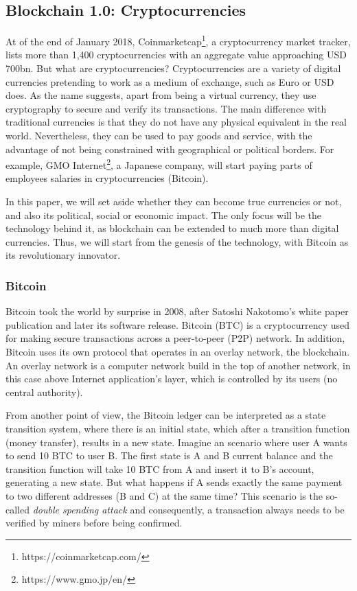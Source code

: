 \subsection{Blockchain 1.0: Cryptocurrencies}

At of the end of January 2018, Coinmarketcap\footnote{https://coinmarketcap.com/}, a cryptocurrency market tracker, lists more than 1,400 cryptocurrencies with an aggregate value approaching USD 700bn. But what are cryptocurrencies? Cryptocurrencies are a variety of digital currencies pretending to work as a medium of exchange, such as Euro or USD does. As the name suggests, apart from being a virtual currency, they use cryptography to secure and verify its transactions. The main difference with traditional currencies is that they do not have any physical equivalent in the real world. Nevertheless, they can be used to pay goods and service, with the advantage of not being constrained with geographical or political borders. For example, GMO Internet\footnote{https://www.gmo.jp/en/}, a Japanese company, will start paying parts of employees salaries in cryptocurrencies (Bitcoin).

In this paper, we will set aside whether they can become true currencies or not, and also its political, social or economic impact. The only focus will be the technology behind it, as blockchain can be extended to much more than digital currencies. Thus, we will start from the genesis of the technology, with Bitcoin as its revolutionary innovator.


\subsubsection{Bitcoin}

Bitcoin took the world by surprise in 2008, after Satoshi Nakotomo's white paper publication \cite{nakamoto2008bitcoin} and later its software release. Bitcoin (BTC) is a cryptocurrency used for making secure transactions across a peer-to-peer (P2P) network. In addition, Bitcoin uses its own protocol that operates in an overlay network, the blockchain. An overlay network is a computer network build in the top of another network, in this case above Internet application's layer, which is controlled by its users (no central authority).

From another point of view, the Bitcoin ledger can be interpreted as a state transition system, where there is an initial state, which after a transition function (money transfer), results in a new state. Imagine an scenario where user A wants to send 10 BTC to user B. The first state is A and B current balance and the transition function will take 10 BTC from A and insert it to B's account, generating a new state. But what happens if A sends exactly the same payment to two different addresses (B and C) at the same time? This scenario is the so-called \textit{double spending attack} and consequently, a transaction always needs to be verified by miners before being confirmed. 

